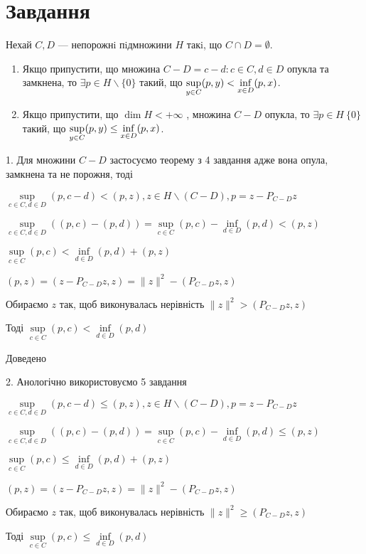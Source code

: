 
\chapter{Завдання \theHchapter}


\begin{tcolorbox}[title=Завдання]
    Нехай $C, D$ — непорожнi пiдмножини $H$ такi, що 
    $C \cap D = \emptyset$. 
    \begin{enumerate}
        \item 
            Якщо припустити, що множина 
            $C - D = {c - d : c \in C, d \in D}$ 
            опукла та замкнена,
            то $ \exists p \in H \backslash \{0\}$ такий, що 
            $ \displaystyle\sup_{y \in C} (p, y) < \displaystyle\inf_{x \in D} (p, x)$.
        \item
            Якщо припустити, що $\dim H < +\infty$ , множина $C - D$
            опукла, то $\exists p \in H\ \{0\}$
            такий, що 
            $\displaystyle\sup_{y \in C} (p, y) \le \displaystyle\inf_{x \in D}(p, x)$.
    \end{enumerate}
    
\end{tcolorbox}





1. Для множини $C - D$ застосуємо теорему з 4 завдання 
адже вона опула, замкнена та не порожня, тоді


$ \sup\limits_{c \in C, d \in D}(p, c - d) < (p, z), 
z \in H \backslash (C-D), p = z - P_{C-D}z $


$\sup\limits_{c \in C, d \in D}((p, c) - (p, d)) = 
\sup\limits_{c \in C}(p, c) - \inf\limits_{d \in D}(p, d) < (p, z)  $


$ \sup\limits_{c \in C}(p, c) < \inf\limits_{d \in D}(p, d) + (p, z)$


$ (p, z) = (z - P_{C-D}z, z) = \|z\|^2 - (P_{C - D}z, z)$


Обираємо $z$ так, щоб виконувалась нерівність
$\|z\|^2 > (P_{C - D}z, z)$


Тоді 
$\sup\limits_{c \in C}(p, c) < \inf\limits_{d \in D}(p, d)$

Доведено


2. Анологічно використовуємо 5 завдання


$ \sup\limits_{c \in C, d \in D}(p, c - d) \le (p, z), 
z \in H \backslash (C-D), p = z - P_{C-D}z $

$\sup\limits_{c \in C, d \in D}((p, c) - (p, d)) = 
\sup\limits_{c \in C}(p, c) - \inf\limits_{d \in D}(p, d) \le (p, z)  $


$ \sup\limits_{c \in C}(p, c) \le \inf\limits_{d \in D}(p, d) + (p, z)$


$ (p, z) = (z - P_{C-D}z, z) = \|z\|^2 - (P_{C - D}z, z)$


Обираємо $z$ так, щоб виконувалась нерівність
$\|z\|^2 \geq (P_{C - D}z, z)$


Тоді 
$\sup\limits_{c \in C}(p, c) \le \inf\limits_{d \in D}(p, d)$

